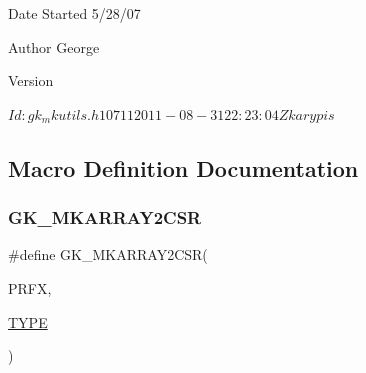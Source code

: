 \begin{DoxyDate}{Date}
Started 5/28/07 
\end{DoxyDate}
\begin{DoxyAuthor}{Author}
George 
\end{DoxyAuthor}
\begin{DoxyVersion}{Version}
\begin{DoxyVerb}$Id: gk_mkutils.h 10711 2011-08-31 22:23:04Z karypis $ \end{DoxyVerb}
 
\end{DoxyVersion}


\subsection{Macro Definition Documentation}
\mbox{\label{a00074_ab124cab2d7d1be838a8727b42ac7d44e}} 
\subsubsection{\texorpdfstring{G\+K\+\_\+\+M\+K\+A\+R\+R\+A\+Y2\+C\+SR}{GK\_MKARRAY2CSR}}
{\footnotesize\ttfamily \#define G\+K\+\_\+\+M\+K\+A\+R\+R\+A\+Y2\+C\+SR(\begin{DoxyParamCaption}\item[{}]{P\+R\+FX,  }\item[{}]{\hyperlink{a00608_a0bc6723d5d4776ab7cdc646728b775f7}{T\+Y\+PE} }\end{DoxyParamCaption})}

